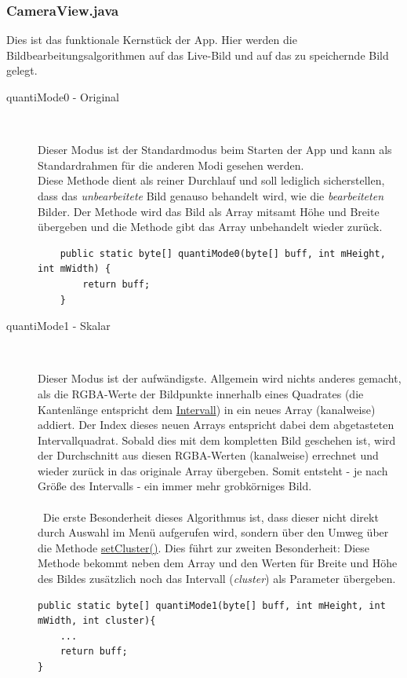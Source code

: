 \subsubsection{CameraView.java}
\label{CameraView}

Dies ist das funktionale Kernstück der App. Hier werden die Bildbearbeitungsalgorithmen auf das Live-Bild und auf das zu speichernde Bild gelegt. 
\\
\begin{description}
\item[quantiMode0 - Original]~\par
\label{quantimode0}
Dieser Modus ist der Standardmodus beim Starten der App und kann als Standardrahmen für die anderen Modi gesehen werden.\\ 
Diese Methode dient als reiner Durchlauf und soll lediglich sicherstellen, dass das \textit{unbearbeitete} Bild genauso behandelt wird, wie die \textit{bearbeiteten} Bilder. Der Methode wird das Bild als Array mitsamt Höhe und Breite übergeben und die Methode gibt das Array unbehandelt wieder zurück. 
\begin{lstlisting}
    public static byte[] quantiMode0(byte[] buff, int mHeight, int mWidth) {
        return buff;
    }
\end{lstlisting}

\item[quantiMode1 - Skalar]~\par
\label{quantimode1}
Dieser Modus ist der aufwändigste. Allgemein wird nichts anderes gemacht, als die RGBA-Werte der Bildpunkte innerhalb eines Quadrates (die Kantenlänge entspricht dem \hyperref[intervall]{Intervall}) in ein neues Array (kanalweise) addiert. Der Index dieses neuen Arrays entspricht dabei dem abgetasteten Intervallquadrat. Sobald dies mit dem kompletten Bild geschehen ist, wird der Durchschnitt aus diesen RGBA-Werten (kanalweise) errechnet und wieder zurück in das originale Array übergeben. Somit entsteht - je nach Größe des Intervalls - ein immer mehr grobkörniges Bild.\\ 
\\\
Die erste Besonderheit dieses Algorithmus ist, dass dieser nicht direkt durch Auswahl im Menü aufgerufen wird, sondern über den Umweg über die Methode \hyperref[interval]{setCluster()}. Dies führt zur zweiten Besonderheit: Diese Methode bekommt neben dem Array und den Werten für Breite und Höhe des Bildes zusätzlich noch das Intervall (\textit{cluster}) als Parameter übergeben.
\begin{lstlisting}
public static byte[] quantiMode1(byte[] buff, int mHeight, int mWidth, int cluster){ 
	...
	return buff;
} 
\end{lstlisting}


\end{description}
